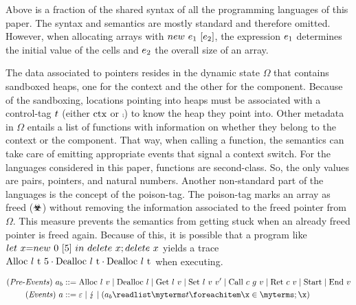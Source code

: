 \documentclass[utf8,acmsmall,review,screen,dvipsnames,anonymous]{acmart}
\begin{document}
Above is a fraction of the shared syntax of all the programming languages of this paper.
The syntax and semantics are mostly standard and therefore omitted.
However, when allocating arrays with $\lnew{\expr[_{1}]}{\expr[_{2}]}$, the expression $\expr[_{1}]$ determines the initial value of the cells and $\expr[_{2}]$ the overall size of an array.

The data associated to pointers resides in the dynamic state $\Omega$ that contains sandboxed heaps, one for the context and the other for the component.
Because of the sandboxing, locations pointing into heaps must be associated with a control-tag $\sandboxtag$ (either $\ctx$ or $\comp$) to know the heap they point into.
Other metadata in $\Omega$ entails a list of functions with information on whether they belong to the context or the component.
That way, when calling a function, the semantics can take care of emitting appropriate events that signal a context switch.
For the languages considered in this paper, functions are second-class.
So, the only values are pairs, pointers, and natural numbers.
Another non-standard part of the languages is the concept of the poison-tag.
The poison-tag marks an array as freed ($\poisoned$) without removing the information associated to the freed pointer from $\Omega$.
This measure prevents the semantics from getting stuck when an already freed pointer is freed again.
Because of this, it is possible that a program like $\llet{x}{\lnew{0}{5}}{\ldelete{x};\ldelete{x}}$ yields a trace $\ev{Alloc\ \loc\ \sandboxtag\ 5}\cdot\ev{Dealloc\ \loc\ \sandboxtag}\cdot\ev{Dealloc\ \loc\ \sandboxtag}$ when executing.

\begin{gather*}
  \begin{aligned}
  \mi{(Pre\text{-}Events)}~\event[_{b}]&\bnfdef \ev{Alloc}\ \loc\ \valueexpr \mid \ev{Dealloc}\ \loc \mid \ev{Get}\ \loc\ \valueexpr \mid \ev{Set}\ \loc\ \valueexpr\ \valueexpr['] \mid \ev{Call}\ \comm\ g\ \valueexpr \mid \ev{Ret}\ \comm\ \valueexpr \mid \ev{Start} \mid \ev{End}\ \valueexpr \\
  \mi{(Events)}~\event&\bnfdef \emptyevent \mid \lightning \mid \tup{\event[_{b}]}{\sandboxtag} \\
  \end{aligned}
\end{gather*}
\end{document}
